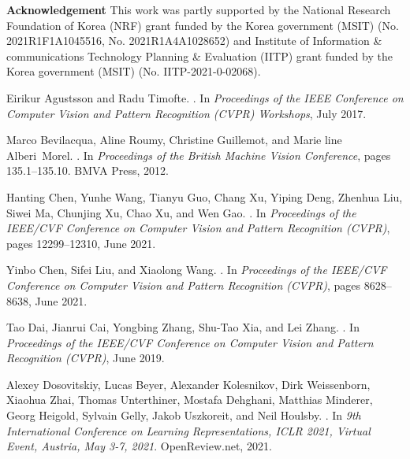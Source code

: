 \documentclass[10pt,twocolumn,letterpaper]{article}
\begin{document}
\vspace{8pt}
\noindent
\small{\textbf{Acknowledgement} This work was partly supported by the National Research Foundation of Korea (NRF) grant funded by the Korea government (MSIT) (No. 2021R1F1A1045516, No. 2021R1A4A1028652) and Institute of Information \& communications Technology Planning \& Evaluation (IITP) grant funded by the Korea government (MSIT) (No. IITP-2021-0-02068).}






{\small

\begin{thebibliography}{10}\itemsep=-1pt

Eirikur Agustsson and Radu Timofte.
.
\newblock In {\em Proceedings of the IEEE Conference on Computer Vision and
  Pattern Recognition (CVPR) Workshops}, July 2017.

Marco Bevilacqua, Aline Roumy, Christine Guillemot, and Marie line
  Alberi~Morel.
.
\newblock In {\em Proceedings of the British Machine Vision Conference}, pages
  135.1--135.10. BMVA Press, 2012.

Hanting Chen, Yunhe Wang, Tianyu Guo, Chang Xu, Yiping Deng, Zhenhua Liu, Siwei
  Ma, Chunjing Xu, Chao Xu, and Wen Gao.
.
\newblock In {\em Proceedings of the IEEE/CVF Conference on Computer Vision and
  Pattern Recognition (CVPR)}, pages 12299--12310, June 2021.

Yinbo Chen, Sifei Liu, and Xiaolong Wang.
.
\newblock In {\em Proceedings of the IEEE/CVF Conference on Computer Vision and
  Pattern Recognition (CVPR)}, pages 8628--8638, June 2021.

Tao Dai, Jianrui Cai, Yongbing Zhang, Shu-Tao Xia, and Lei Zhang.
.
\newblock In {\em Proceedings of the IEEE/CVF Conference on Computer Vision and
  Pattern Recognition (CVPR)}, June 2019.

Alexey Dosovitskiy, Lucas Beyer, Alexander Kolesnikov, Dirk Weissenborn,
  Xiaohua Zhai, Thomas Unterthiner, Mostafa Dehghani, Matthias Minderer, Georg
  Heigold, Sylvain Gelly, Jakob Uszkoreit, and Neil Houlsby.
.
\newblock In {\em 9th International Conference on Learning Representations,
  {ICLR} 2021, Virtual Event, Austria, May 3-7, 2021}. OpenReview.net, 2021.


\end{thebibliography}}
\end{document}
